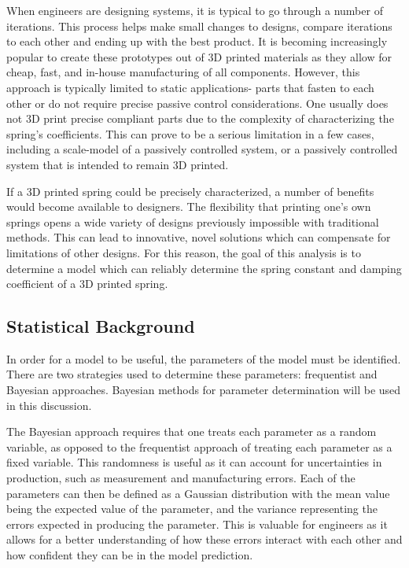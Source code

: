 \documentclass[conference]{article}
\begin{document}
When engineers are designing systems, it is typical to go through a number of iterations. This process helps make small changes to designs, compare iterations to each other and ending up with the best product. It is becoming increasingly popular to create these prototypes out of 3D printed materials as they allow for cheap, fast, and in-house manufacturing of all components. However, this approach is typically limited to static applications- parts that fasten to each other or do not require precise passive control considerations. One usually does not 3D print precise compliant parts due to the complexity of characterizing the spring's coefficients.  This can prove to be a serious limitation in a few cases, including a scale-model of a passively controlled system, or a passively controlled system that is intended to remain 3D printed. 

If a 3D printed spring could be precisely characterized, a number of benefits would become available to designers. The flexibility that printing one's own springs opens a wide variety of designs previously impossible with traditional methods. This can lead to innovative, novel solutions which can compensate for limitations of other designs. For this reason, the goal of this analysis is to determine a model which can reliably determine the spring constant and damping coefficient of a 3D printed spring.

\subsection{Statistical Background}

In order for a model to be useful, the parameters of the model must be identified. There are two strategies used to determine these parameters: frequentist and Bayesian approaches. Bayesian methods for parameter determination will be used in this discussion.

The Bayesian approach requires that one treats each parameter as a random variable, as opposed to the frequentist approach of treating each parameter as a fixed variable. This randomness is useful as it can account for uncertainties in production, such as measurement and manufacturing errors. Each of the parameters can then be defined as a Gaussian distribution with the mean value being the expected value of the parameter, and the variance representing the errors expected in producing the parameter. This is valuable for engineers as it allows for a better understanding of how these errors interact with each other and how confident they can be in the model prediction. 
\end{document}
